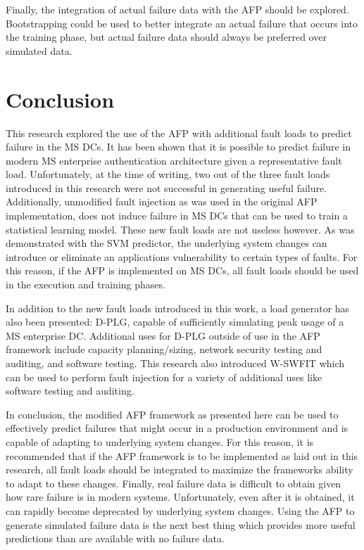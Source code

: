 Finally, the integration of actual failure data with the \ac{AFP} should be
explored.  Bootstrapping could be used to better integrate an actual failure
that occurs into the training phase, but actual failure data should always be
preferred over simulated data.

\section{Conclusion}
This research explored the use of the \ac{AFP} with additional fault loads to
predict failure in the \ac{MS} \ac{DC}s.  It has been shown that it is possible
to predict failure in modern \ac{MS} enterprise authentication architecture
given a representative fault load.  Unfortunately, at the time of writing, two
out of the three fault loads introduced in this research were not successful in
generating useful failure.  Additionally, unmodified fault injection as was
used in the original \ac{AFP} implementation, does not induce failure in
\ac{MS} \ac{DC}s that can be used to train a statistical learning model.  These
new fault loads are not useless however.  As was demonstrated with the \ac{SVM}
predictor, the underlying system changes can introduce or eliminate an
applications vulnerability to certain types of faults.  For this reason, if the
\ac{AFP} is implemented on \ac{MS} \ac{DC}s, all fault loads should be used in
the execution and training phases.

In addition to the new fault loads introduced in this work, a load generator
has also been presented:  \ac{D-PLG}, capable of sufficiently simulating peak
usage of a \ac{MS} enterprise \ac{DC}.  Additional uses for \ac{D-PLG} outside
of use in the \ac{AFP} framework include capacity planning/sizing, network
security testing and auditing, and software testing.  This research also
introduced \ac{W-SWFIT} which can be used to perform fault injection for a
variety of additional uses like software testing and auditing.

In conclusion, the modified \ac{AFP} framework as presented here can be used to
effectively predict failures that might occur in a production environment and
is capable of adapting to underlying system changes.  For this reason, it is
recommended that if the \ac{AFP} framework is to be implemented as laid out in
this research, all fault loads should be integrated to maximize the frameworks
ability to adapt to these changes.  Finally, real failure data is difficult to
obtain given how rare failure is in modern systems.  Unfortunately, even after
it is obtained, it can rapidly become deprecated by underlying system changes.
Using the \ac{AFP} to generate simulated failure data is the next best thing
which provides more useful predictions than are available with no failure data.
